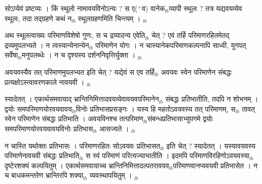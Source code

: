 \documentclass[article,12pt,a4paper]{memoir}%
\newcommand{\add}[1]{($^{+}$#1)}
\newcounter{parCount}
\begin{document}
	  \pstart \leavevmode%
	सोऽप्येवं प्रष्टव्यः । किं स्थूलो नामावयविनोऽन्यः ? स ए\add{व} वानेक{\tiny $_{lb}$}व्यापी स्थूलः ? तत्र यद्यवयव्येव स्थूलः, तदा \leavevmode{} तद्ग्रहणे कथं न{\tiny $_{lb}$} स्थूलग्रहणमिति चिन्त्यम् ।
	{}
	\pend%
      {\tiny $_{lb}$}

	  \pstart \leavevmode%
	अथ स्थूलत्वाख्यः परिमाणविशेषो गुणः, स च द्रव्यादन्य एवेति{\tiny $_{lb}$} चेत् ? एवं तर्हि परिमाणरहितमेतद् द्रव्यमुपलभ्यते । न त्वस्यान्येनान्येन{\tiny $_{lb}$} \leavevmode{} परिमाणेन योगः । न चास्यानेकपरिमाणकल्पनापि साध्वी, युगपत् सर्वेषा{\tiny $_{lb}$}मनुपलब्धेः । न च दृश्यस्य दर्शननिवृत्तिर्युक्ता ।
	{}
	\pend%
      {\tiny $_{lb}$}

	  \pstart \leavevmode%
	अवयवस्यैव तत् परिमाणमुपलभ्यत इति चेत् ? यद्येवं स एव तर्हि{\tiny $_{lb}$} अवयवः स्वेन परिमाणेन संबद्धः प्रत्यक्षोऽस्त्वावरणकाले नावयवी ।
	{}
	\pend%
      {\tiny $_{lb}$}

	  \pstart \leavevmode%
	स्यादेतत् । एकार्थसमवायाद् भ्रान्तिनिमित्तादवयव्येवावयवपरिमानेन{\tiny $_{lb}$} संबद्धः प्रतिभातीति, तदपि न शोभनम् । द्वयोः समपरिमाणयोरवयवावय{\tiny $_{lb}$}विनोः प्रतिभासप्रसङ्गः । यस्य हि महतोऽवयवस्य तत् परिमाणम्, स{\tiny $_{lb}$} तावत् स्वेन परिमाणेन संबद्धः प्रतिभाति । अवयविनश्च तत्परिमाण{\tiny $_{lb}$}संबन्धप्रतिभासाभ्युपगमे द्वयोः समपरिमाणयोरवयवावयविनोः प्रतिभास{\tiny $_{lb}$} आसज्यते ।
	{}
	\pend%
      {\tiny $_{lb}$}

	  \pstart \leavevmode%
	न चास्ति यथोक्तः प्रतिभासः । परिमाणरहितः सोऽवयवः प्रतिभासत{\tiny $_{lb}$} इति चेत् ? स्यादेतत् । यस्यावयवस्य परिमाणेनावयवी संबद्धः प्रतिभाति{\tiny $_{lb}$} स स्वं परिमाणं परित्यज्याभातीति । इदमपि परिमाणविरहिणोऽवयवस्या{\tiny $_{lb}$}दृष्टेरशक्यं कल्पयितुम् । एकार्थसमवायाच्च भ्रान्तिनिमित्तादल्पतरावयव{\tiny $_{lb}$}परिमाणवानप्यवयवी प्रतिभासेत । न च बाधकमन्तरेण भ्रान्तिरपि शक्या{\tiny $_{lb}$} व्यवस्थापयितुम् ।
	{}
	\pend%
      {\tiny $_{lb}$}
\end{document}
